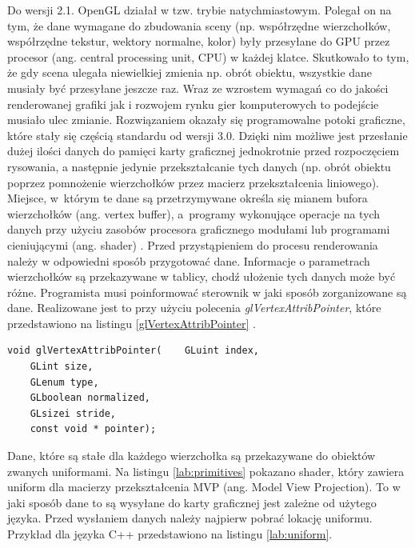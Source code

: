 \documentclass[archive]{mgr}
\begin{document}
Do wersji 2.1. OpenGL działał w tzw. trybie natychmiastowym. Polegał on na tym, że dane wymagane do zbudowania sceny (np. współrzędne wierzchołków, współrzędne tekstur, wektory normalne, kolor) były przesyłane do GPU przez procesor (ang. central processing unit, CPU) w każdej klatce. Skutkowało to tym, że gdy scena ulegała niewielkiej zmienia np. obrót obiektu, wszystkie dane musiały być przesyłane jeszcze raz. Wraz ze wzrostem wymagań co do jakości renderowanej grafiki jak i rozwojem rynku gier komputerowych to podejście musiało ulec zmianie. Rozwiązaniem okazały się programowalne potoki graficzne, które stały się częścią standardu od wersji 3.0. Dzięki nim możliwe jest przesłanie dużej ilości danych do pamięci karty graficznej jednokrotnie przed rozpoczęciem rysowania, a następnie jedynie przekształcanie tych danych (np. obrót obiektu poprzez pomnożenie wierzchołków przez macierz przekształcenia liniowego). 
Miejsce, w~którym te dane są przetrzymywane określa się mianem bufora wierzchołków (ang. vertex buffer), a~programy wykonujące operacje na tych danych przy użyciu zasobów procesora graficznego modułami lub programami cieniującymi (ang. shader) \cite{kiciak}.
\newpage
Przed przystąpieniem do procesu renderowania należy w odpowiedni sposób przygotować dane. Informacje o parametrach wierzchołków są przekazywane w tablicy, chodź ułożenie tych danych może być różne. Programista musi poinformować sterownik w jaki sposób zorganizowane są dane. Realizowane jest to przy użyciu polecenia \emph{glVertexAttribPointer}, które przedstawiono na listingu \ref{glVertexAttribPointer} \cite{OpenGLAttrib}.\\

\begin{lstlisting}[caption={Funkcja glVertexAttribPointer},captionpos=b,label={glVertexAttribPointer}]
 void glVertexAttribPointer(	GLuint index,
 	GLint size,
 	GLenum type,
 	GLboolean normalized,
 	GLsizei stride,
 	const void * pointer);
\end{lstlisting}

Dane, które są stałe dla każdego wierzchołka są przekazywane do obiektów zwanych uniformami. Na listingu \ref{lab:primitives} pokazano shader, który zawiera uniform dla macierzy przekształcenia MVP (ang. Model View Projection). To w jaki sposób dane to są wysyłane do karty graficznej jest zależne od użytego języka. Przed wysłaniem danych należy najpierw pobrać lokację uniformu. Przykład dla języka C++ przedstawiono na listingu \ref{lab:uniform}.
\\
\end{document}
